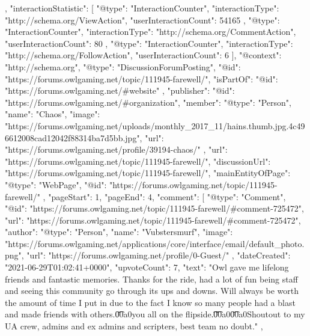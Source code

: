 {{    },
    "interactionStatistic": [
        {
            "@type": "InteractionCounter",
            "interactionType": "http://schema.org/ViewAction",
            "userInteractionCount": 54165
        },
        {
            "@type": "InteractionCounter",
            "interactionType": "http://schema.org/CommentAction",
            "userInteractionCount": 80
        },
        {
            "@type": "InteractionCounter",
            "interactionType": "http://schema.org/FollowAction",
            "userInteractionCount": 6
        }
    ],
    "@context": "http://schema.org",
    "@type": "DiscussionForumPosting",
    "@id": "https://forums.owlgaming.net/topic/111945-farewell/",
    "isPartOf": {
        "@id": "https://forums.owlgaming.net/#website"
    },
    "publisher": {
        "@id": "https://forums.owlgaming.net/#organization",
        "member": {
            "@type": "Person",
            "name": "Chaos",
            "image": "https://forums.owlgaming.net/uploads/monthly_2017_11/hains.thumb.jpg.4c496612008cad12042f88314ba7d5bb.jpg",
            "url": "https://forums.owlgaming.net/profile/39194-chaos/"
        }
    },
    "url": "https://forums.owlgaming.net/topic/111945-farewell/",
    "discussionUrl": "https://forums.owlgaming.net/topic/111945-farewell/",
    "mainEntityOfPage": {
        "@type": "WebPage",
        "@id": "https://forums.owlgaming.net/topic/111945-farewell/"
    },
    "pageStart": 1,
    "pageEnd": 4,
    "comment": [
        {
            "@type": "Comment",
            "@id": "https://forums.owlgaming.net/topic/111945-farewell/#comment-725472",
            "url": "https://forums.owlgaming.net/topic/111945-farewell/#comment-725472",
            "author": {
                "@type": "Person",
                "name": "Vubstersmurf",
                "image": "https://forums.owlgaming.net/applications/core/interface/email/default_photo.png",
                "url": "https://forums.owlgaming.net/profile/0-Guest/"
            },
            "dateCreated": "2021-06-29T01:02:41+0000",
            "upvoteCount": 7,
            "text": "Owl gave me lifelong friends and fantastic memories. Thanks for the ride, had a lot of fun being staff and seeing this community go through its ups and downs. Will always be worth the amount of time I put in due to the fact I know so many people had a blast and made friends with others.\n \n\n\n\t\u00a0\n \n\n\n\tCatch you all on the flipside.\n \n\n\n\t \n\n\n\t\u00a0\n \n\n\n\t\u00a0\n \n\n\n\tps Shoutout to my UA crew, admins and ex admins and scripters, best team no doubt.\n \n"
        },
        {
}}
